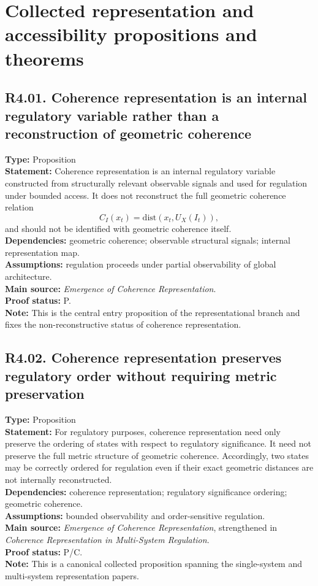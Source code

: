 \documentclass[12pt]{article}
\begin{document}
	\section{Collected representation and accessibility propositions and theorems}
	
	\subsection*{R4.01. Coherence representation is an internal regulatory variable rather than a reconstruction of geometric coherence}
	\textbf{Type:} Proposition \\
	\textbf{Statement:} Coherence representation is an internal regulatory variable constructed
	from structurally relevant observable signals and used for regulation under bounded access.
	It does not reconstruct the full geometric coherence relation
	\[
	C_I(x_t)=\mathrm{dist}(x_t,U_X(I_t)),
	\]
	and should not be identified with geometric coherence itself. \\
	\textbf{Dependencies:} geometric coherence; observable structural signals; internal
	representation map. \\
	\textbf{Assumptions:} regulation proceeds under partial observability of global architecture. \\
	\textbf{Main source:} \emph{Emergence of Coherence Representation}. \\
	\textbf{Proof status:} P. \\
	\textbf{Note:} This is the central entry proposition of the representational branch and fixes
	the non-reconstructive status of coherence representation.
	
	\subsection*{R4.02. Coherence representation preserves regulatory order without requiring metric preservation}
	\textbf{Type:} Proposition \\
	\textbf{Statement:} For regulatory purposes, coherence representation need only preserve the
	ordering of states with respect to regulatory significance. It need not preserve the full metric
	structure of geometric coherence. Accordingly, two states may be correctly ordered for
	regulation even if their exact geometric distances are not internally reconstructed. \\
	\textbf{Dependencies:} coherence representation; regulatory significance ordering; geometric
	coherence. \\
	\textbf{Assumptions:} bounded observability and order-sensitive regulation. \\
	\textbf{Main source:} \emph{Emergence of Coherence Representation}, strengthened in
	\emph{Coherence Representation in Multi-System Regulation}. \\
	\textbf{Proof status:} P/C. \\
	\textbf{Note:} This is a canonical collected proposition spanning the single-system and
	multi-system representation papers.
	
\end{document}
